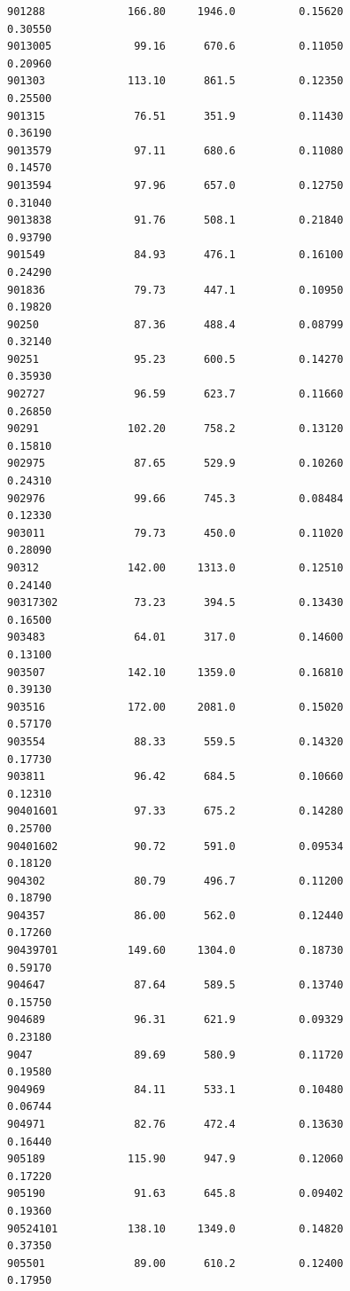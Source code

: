 \documentclass[
  letterpaper,
  DIV=11,
  numbers=noendperiod]{scrartcl}
\begin{document}
\begin{verbatim}
901288             166.80     1946.0          0.15620           0.30550
9013005             99.16      670.6          0.11050           0.20960
901303             113.10      861.5          0.12350           0.25500
901315              76.51      351.9          0.11430           0.36190
9013579             97.11      680.6          0.11080           0.14570
9013594             97.96      657.0          0.12750           0.31040
9013838             91.76      508.1          0.21840           0.93790
901549              84.93      476.1          0.16100           0.24290
901836              79.73      447.1          0.10950           0.19820
90250               87.36      488.4          0.08799           0.32140
90251               95.23      600.5          0.14270           0.35930
902727              96.59      623.7          0.11660           0.26850
90291              102.20      758.2          0.13120           0.15810
902975              87.65      529.9          0.10260           0.24310
902976              99.66      745.3          0.08484           0.12330
903011              79.73      450.0          0.11020           0.28090
90312              142.00     1313.0          0.12510           0.24140
90317302            73.23      394.5          0.13430           0.16500
903483              64.01      317.0          0.14600           0.13100
903507             142.10     1359.0          0.16810           0.39130
903516             172.00     2081.0          0.15020           0.57170
903554              88.33      559.5          0.14320           0.17730
903811              96.42      684.5          0.10660           0.12310
90401601            97.33      675.2          0.14280           0.25700
90401602            90.72      591.0          0.09534           0.18120
904302              80.79      496.7          0.11200           0.18790
904357              86.00      562.0          0.12440           0.17260
90439701           149.60     1304.0          0.18730           0.59170
904647              87.64      589.5          0.13740           0.15750
904689              96.31      621.9          0.09329           0.23180
9047                89.69      580.9          0.11720           0.19580
904969              84.11      533.1          0.10480           0.06744
904971              82.76      472.4          0.13630           0.16440
905189             115.90      947.9          0.12060           0.17220
905190              91.63      645.8          0.09402           0.19360
90524101           138.10     1349.0          0.14820           0.37350
905501              89.00      610.2          0.12400           0.17950

\end{verbatim}
\end{document}
